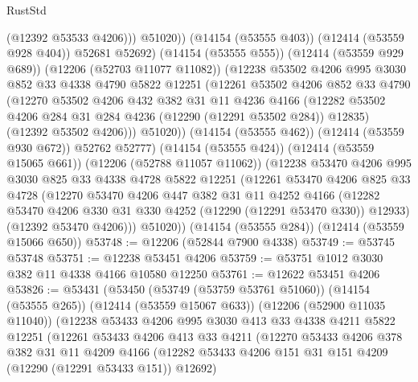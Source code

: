 \begin{lexlean}{RustStd}
\begin{coremodule}
{\begin{coremodule}
{{{{{{{{{{{{{{{{{{{{{{{{{{{{{{{{{{{{{{{{{{{{{{{{{{                    (@12392 @53533 @4206)))
                @51020))
            (@14154 (@53555 @403))
            (@12414 (@53559 @928 @404))
            @52681
            @52692)
          (@14154 (@53555 @555))
          (@12414 (@53559 @929 @689))
          (@12206 (@52703 @11077 @11082))
          (@12238
            @53502
            @4206
            @995
            @3030
            @852
            @33
            @4338
            @4790
            @5822
            @12251
            (@12261
              @53502
              @4206
              @852
              @33
              @4790
              (@12270
                @53502
                @4206
                @432
                @382
                @31
                @11
                @4236
                @4166
                (@12282 @53502 @4206 @284 @31 @284 @4236 (@12290 (@12291 @53502 @284)) @12835)
                (@12392 @53502 @4206)))
            @51020))
        (@14154 (@53555 @462))
        (@12414 (@53559 @930 @672))
        @52762
        @52777)
      (@14154 (@53555 @424))
      (@12414 (@53559 @15065 @661))
      (@12206 (@52788 @11057 @11062))
      (@12238
        @53470
        @4206
        @995
        @3030
        @825
        @33
        @4338
        @4728
        @5822
        @12251
        (@12261
          @53470
          @4206
          @825
          @33
          @4728
          (@12270
            @53470
            @4206
            @447
            @382
            @31
            @11
            @4252
            @4166
            (@12282 @53470 @4206 @330 @31 @330 @4252 (@12290 (@12291 @53470 @330)) @12933)
            (@12392 @53470 @4206)))
        @51020))
    (@14154 (@53555 @284))
    (@12414 (@53559 @15066 @650))
@53748 := @12206 (@52844 @7900 @4338)
@53749 := @53745 @53748
@53751 := @12238 @53451 @4206
@53759 := @53751 @1012 @3030 @382 @11 @4338 @4166 @10580 @12250
@53761 := @12622 @53451 @4206
@53826 := @53431
    (@53450
      (@53749 (@53759 @53761 @51060))
      (@14154 (@53555 @265))
      (@12414 (@53559 @15067 @633))
      (@12206 (@52900 @11035 @11040))
      (@12238
        @53433
        @4206
        @995
        @3030
        @413
        @33
        @4338
        @4211
        @5822
        @12251
        (@12261
          @53433
          @4206
          @413
          @33
          @4211
          (@12270
            @53433
            @4206
            @378
            @382
            @31
            @11
            @4209
            @4166
            (@12282 @53433 @4206 @151 @31 @151 @4209 (@12290 (@12291 @53433 @151)) @12692)
}}}}}}}}}}}}}}}}}}}}}}}}}}}}}}}}}}}}}}}}}}}}}}}}}}
\end{coremodule}}
\end{coremodule}
\end{lexlean}
